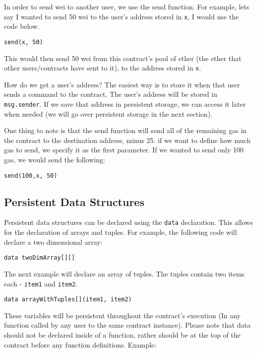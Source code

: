 \documentclass[12pt]{article}
\begin{document}
In order to send wei to another user, we use the send function. For example, lets say I wanted to send 50 wei to the user's address stored in \texttt{x}, I would use the code below.

\begin{verbatim}
send(x, 50)
\end{verbatim}

This would then send 50 wei from this contract's pool of ether (the ether that other users/contracts have sent to it), to the address stored in \texttt{x}.

How do we get a user's address? The easiest way is to store it when that user sends a command to the contract. The user's address will be stored in \texttt{msg.sender}. If we save that address in persistent storage, we can access it later when needed \cite{Serpent} (we will go over persistent storage in the next section).

One thing to note is that the send function will send all of the remaining gas in the contract to the destination address, minus 25. if we want to define how much gas to send, we specify it as the first parameter. If we wanted to send only 100 gas, we would send the following: 

\begin{verbatim}
send(100,x, 50)
\end{verbatim}

\subsection{Persistent Data Structures}

Persistent data structures can be declared using the \texttt{data} declaration. This allows for the declaration of arrays and tuples. For example, the following code will declare a two dimensional array:

\begin{verbatim}
data twoDimArray[][]
\end{verbatim}

The next example will declare an array of tuples. The tuples contain two items each - \texttt{item1} and \texttt{item2}.

\begin{verbatim}
data arrayWithTuples[](item1, item2)
\end{verbatim}

These variables will be persistent throughout the contract's execution (In any function called by any user to the same contract instance). Please note that data should not be declared inside of a function, rather should be at the top of the contract before any function definitions. Example:
\end{document}
